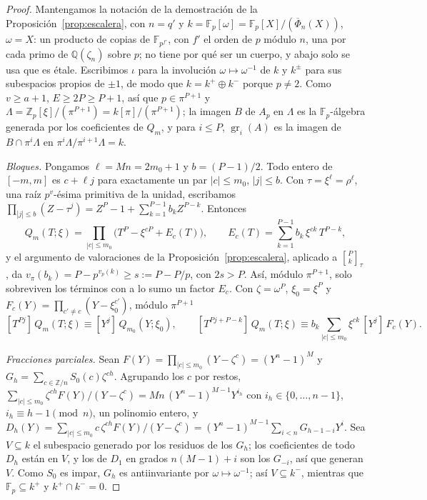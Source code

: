 \documentclass[11pt,a4paper]{article}
\theoremstyle{definition}
\newcommand{\ZZ}{\mathbb{Z}}
\newcommand{\QQ}{\mathbb{Q}}
\newcommand{\FF}{\mathbb{F}}
\newcommand{\gr}{\operatorname{gr}}
\begin{document}
\begin{proof}
Mantengamos la notación de la demostración de la Proposición~\ref{prop:escalera}, con $n=q'$ y
$k=\FF_p[\omega]=\FF_p[X]/(\overline\Phi_n(X))$, $\omega=X$: un producto de copias de $\FF_{p^{f'}}$, con $f'$ el orden
de $p$ módulo $n$, una por cada primo de $\QQ(\zeta_n)$ sobre $p$; no tiene por qué ser un cuerpo, y abajo solo se
usa que es étale. Escribimos $\iota$ para la involución $\omega\mapsto\omega^{-1}$ de $k$ y
$k^\pm$ para sus subespacios propios de $\pm1$, de modo que $k=k^+\oplus k^-$ porque $p\neq2$. Como
$v\ge a+1$, $E\ge2P\ge P+1$, así que $p\in\pi^{P+1}$ y $\Lambda=\ZZ_p[\xi]/(\pi^{P+1})=k[\pi]/(\pi^{P+1})$; la imagen $B$
de $A_p$ en $\Lambda$ es la $\FF_p$-álgebra generada por los coeficientes de $Q_m$, y para $i\le P$, $\gr_i(A)$ es la
imagen de $B\cap\pi^i\Lambda$ en $\pi^i\Lambda/\pi^{i+1}\Lambda=k$.

\emph{Bloques.} Pongamos $\ell=Mn=2m_0+1$ y $b=(P-1)/2$. Todo entero de $[-m,m]$ es $c+\ell j$ para exactamente un par
$|c|\le m_0$, $|j|\le b$. Con $\tau=\xi^\ell=\rho^\ell$, una raíz $p^v$-ésima primitiva de la unidad, escribamos
$\prod_{|j|\le b}(Z-\tau^j)=Z^P-1+\sum_{k=1}^{P-1}b_kZ^{P-k}$. Entonces
\begin{equation}\label{eq:bloques}
Q_m(T;\xi)=\prod_{|c|\le m_0}\bigl(T^P-\xi^{cP}+E_c(T)\bigr),\qquad E_c(T)=\sum_{k=1}^{P-1}b_k\,\xi^{ck}\,T^{P-k},
\end{equation}
y el argumento de valoraciones de la Proposición~\ref{prop:escalera}, aplicado a $\genfrac{[}{]}{0pt}{}{P}{k}_\tau$, da
$v_\pi(b_k)=P-p^{v_p(k)}\ge s:=P-P/p$, con $2s>P$. Así, módulo $\pi^{P+1}$, solo sobreviven los términos con a lo sumo un
factor $E_c$. Con $\zeta=\omega^P$, $\xi_0=\xi^P$ y $F_c(Y)=\prod_{c'\ne c}(Y-\xi_0^{c'})$,
módulo $\pi^{P+1}$
\[
[T^{Pj}]\,Q_m(T;\xi)\equiv[Y^j]\,Q_{m_0}(Y;\xi_0),\qquad
[T^{Pj+P-k}]\,Q_m(T;\xi)\equiv b_k\sum_{|c|\le m_0}\xi^{ck}\,[Y^j]\,F_c(Y).
\]

\emph{Fracciones parciales.} Sean $F(Y)=\prod_{|c|\le m_0}(Y-\zeta^c)=(Y^n-1)^M$ y $G_h=\sum_{c\in\ZZ/n}S_0(c)\zeta^{ch}$.
Agrupando los $c$ por restos, $\sum_{|c|\le m_0}\zeta^{ch}F(Y)/(Y-\zeta^c)=Mn\,(Y^n-1)^{M-1}Y^{i_h}$ con $i_h\in\{0,\dots,n-1\}$, $i_h\equiv h-1\pmod n$,
un polinomio entero, y $D_h(Y)=\sum_{|c|\le m_0}c\,\zeta^{ch}F(Y)/(Y-\zeta^c)=(Y^n-1)^{M-1}\sum_{i<n}G_{h-1-i}Y^i$.
Sea $V\subseteq k$ el subespacio generado por los residuos de los $G_h$; los coeficientes de todo $D_h$ están en $V$, y
los de $D_1$ en grados $n(M-1)+i$ son los $G_{-i}$, así que generan $V$. Como $S_0$ es impar, $G_h$ es antiinvariante
por $\omega\mapsto\omega^{-1}$; así $V\subseteq k^-$, mientras que $\FF_p\subseteq k^+$ y $k^+\cap k^-=0$.


\end{proof}
\end{document}
